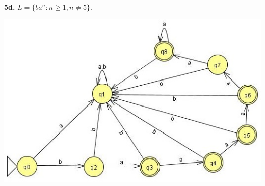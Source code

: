 \documentclass[12pt,letter]{article}
\begin{document}
\textbf{5d.} $L = \lbrace ba^n : n \geq 1, n \neq 5 \rbrace$.
\begin{center}
	\includegraphics[scale=0.75]{"images/Lab 1 - 5d"}
\end{center}

%
%
%
%
%
%
\end{document}

